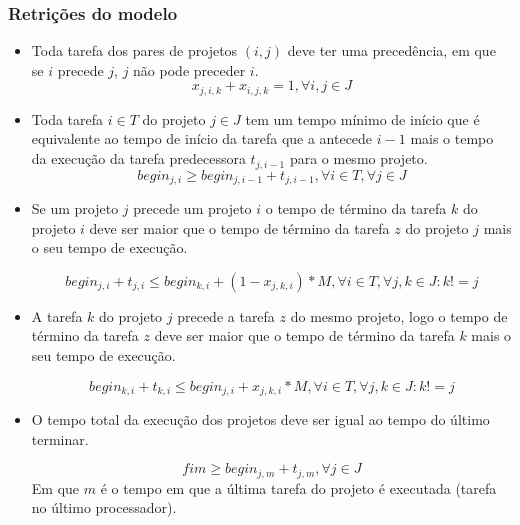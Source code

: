 \documentclass[11pt,letterpaper]{article}
\begin{document}
\subsubsection*{Retrições do modelo}
\begin{itemize}
\item Toda tarefa dos pares de projetos $(i,j)$ deve ter uma precedência, em que se $i$
  precede $j$, $j$ não pode preceder $i$. 
\begin{equation*}
  x_{j,i,k}+x_{i,j,k}=1, \forall i,j \in J
\end{equation*}

\item Toda tarefa $i \in T$ do projeto  $j \in J$ tem um tempo mínimo de início que é equivalente ao tempo de início da tarefa que a antecede $i -1$ mais o tempo da execução da tarefa predecessora $ t_{j,i-1}$ para o mesmo projeto. 
\begin{equation*}
  begin_{j,i} \geq begin_{j,i-1}+ t_{j,i-1}, \forall i \in T, \forall j \in J
\end{equation*}

\item Se um projeto $j$ precede um projeto $i$ o tempo de término da
  tarefa $k$ do projeto $i$ deve ser maior que o tempo de término da
  tarefa $z$ do projeto $j$ mais o seu tempo de execução.
 
\begin{equation*}
  begin_{j,i} + t_{j,i} \leq begin_{k,i}+(1-x_{j,k,i})*M, \forall i \in T, \forall j,k \in J  : k!=j 
\end{equation*}

\item A tarefa $k$ do projeto $j$ precede a tarefa $z$ do mesmo
  projeto, logo o tempo de término da
  tarefa $z$ deve ser maior que o tempo de término da
  tarefa $k$ mais o seu tempo de execução.
 
\begin{equation*}
  begin_{k,i} + t_{k,i} \leq begin_{j,i}+x_{j,k,i}*M, \forall i \in T , \forall j,k \in J : k!=j 
\end{equation*}

\item O tempo total da execução dos projetos deve ser igual ao tempo
  do último terminar.
 
\begin{equation*}
 fim \geq begin_{j,m}+ t_{j,m}, \forall j \in J
\end{equation*}
Em que $m$ é o tempo em que a última tarefa do projeto é executada
(tarefa no último processador).
\end{itemize}
\end{document}
